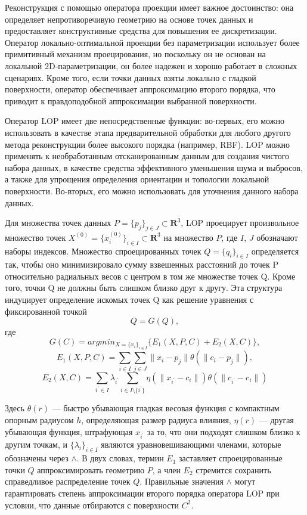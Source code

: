 Реконструкция с помощью оператора проекции имеет важное достоинство: она определяет непротиворечивую геометрию на основе точек данных и предоставляет конструктивные средства для повышения ее дискретизации. 
Оператор локально-оптимальной проекции без параметризации использует более примитивный механизм проецирования, но поскольку он не основан на локальной 2D-параметризации, он более надежен и хорошо работает в сложных сценариях. Кроме того, если точки данных взяты локально с гладкой поверхности, оператор обеспечивает аппроксимацию второго порядка, что приводит к правдоподобной аппроксимации выбранной поверхности.

Оператор LOP имеет две непосредственные функции: во-первых, его можно использовать в качестве этапа предварительной обработки для любого другого метода реконструкции более высокого порядка (например, RBF). LOP можно применять к необработанным отсканированным данным для создания чистого набора данных, в качестве средства эффективного уменьшения шума и выбросов, а также для упрощения определения ориентации и топологии локальной поверхности. Во-вторых, его можно использовать для уточнения данного набора данных.

Для множества точек данных $P = \{p_j\}_{j\in J} \subset \mathbf R^{3}$, LOP проецирует произвольное множество точек $X^{(0)} = \{x_i^{(0)} \} _{i \in I} \subset \mathbf R^{3}$ на множество $P$, где $I$, $J$ обозначают наборы индексов. Множество спроецированных точек $Q = \{q_i\}_{i\in I}$ определяется так, чтобы оно минимизировало сумму взвешенных расстояний до точек P относительно радиальных весов с центром в том же множестве точек Q. Кроме того, точки Q не должны быть слишком близко друг к другу. Эта структура индуцирует определение искомых точек Q как решение уравнения с фиксированной точкой 
$$Q = G(Q),$$
где
$$G(C) = argmin_{X = \{x_i\}_{i \in I}} \{E_1(X,P,C) + E_2(X,C)\},$$
$$E_1(X,P,C) = \sum_{i \in I} \sum_{j \in J}\parallel x_i - p_j \parallel \theta(\parallel c_i - p_j \parallel), $$ 
$$E_2(X, C) = \sum _{i^{'} \in I} \lambda_{i^{'}}\sum_{i \in I \setminus\{i^{'}\}} \eta(\parallel x_{i^{'}}- c_i  \parallel)\theta(\parallel c_{i^{'}} - c_i \parallel)$$

Здесь $\theta(r)$ — быстро убывающая гладкая весовая функция с компактным опорным радиусом $h$, определяющая размер радиуса влияния, $\eta(r)$ — другая убывающая функция, штрафующая $x_{i^{'}}$ за то, что они подходят слишком близко к другим точкам, и $\{\lambda_i\}_{i \in I}$ являются уравновешивающими членами, которые обозначены через $\mathbf \land$. В двух словах, термин $E_1$ заставляет спроецированные точки $Q$ аппроксимировать геометрию $P$, а член $E_2$ стремится  сохранить справедливое распределение точек $Q$. Правильные значения $\mathbf\land$ могут гарантировать степень аппроксимации второго порядка оператора LOP при условии, что данные отбираются с поверхности $C^{2}$.

